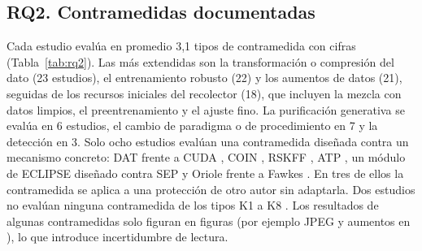 \documentclass[pdflatex,sn-mathphys-num]{sn-jnl}
\theoremstyle{thmstyleone}
\theoremstyle{thmstyletwo}
\theoremstyle{thmstylethree}
\begin{document}
\subsection{RQ2. Contramedidas documentadas}

Cada estudio evalúa en promedio 3{,}1 tipos de contramedida con cifras (Tabla~\ref{tab:rq2}). Las más extendidas son la transformación o compresión del dato (23 estudios), el entrenamiento robusto (22) y los aumentos de datos (21), seguidas de los recursos iniciales del recolector (18), que incluyen la mezcla con datos limpios, el preentrenamiento y el ajuste fino. La purificación generativa se evalúa en 6 estudios, el cambio de paradigma o de procedimiento en 7 y la detección en 3. Solo ocho estudios evalúan una contramedida diseñada contra un mecanismo concreto: DAT frente a CUDA \cite{sadasivan2023cuda}, COIN \cite{li2025coin}, RSKFF \cite{li2026wavelet,li2025kspace}, ATP \cite{li2025crossmodal}, un módulo de ECLIPSE diseñado contra SEP \cite{wang2024eclipse} y Oriole frente a Fawkes \cite{chen2021oriole}. En tres de ellos la contramedida se aplica a una protección de otro autor sin adaptarla. Dos estudios no evalúan ninguna contramedida de los tipos K1 a K8 \cite{wu2025temporal,ye2024ungeneralizable}. Los resultados de algunas contramedidas solo figuran en figuras (por ejemplo JPEG y aumentos en \cite{zhang2025segue}), lo que introduce incertidumbre de lectura.
\end{document}

